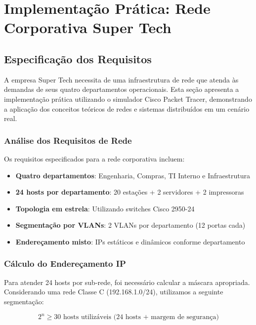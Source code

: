 \section{Implementação Prática: Rede Corporativa Super Tech}

\subsection{Especificação dos Requisitos}

A empresa Super Tech necessita de uma infraestrutura de rede que atenda às demandas de seus quatro departamentos operacionais. Esta seção apresenta a implementação prática utilizando o simulador Cisco Packet Tracer, demonstrando a aplicação dos conceitos teóricos de redes e sistemas distribuídos em um cenário real.

\subsubsection{Análise dos Requisitos de Rede}

Os requisitos especificados para a rede corporativa incluem:

\begin{itemize}
    \item \textbf{Quatro departamentos}: Engenharia, Compras, TI Interno e Infraestrutura
    \item \textbf{24 hosts por departamento}: 20 estações + 2 servidores + 2 impressoras
    \item \textbf{Topologia em estrela}: Utilizando switches Cisco 2950-24
    \item \textbf{Segmentação por VLANs}: 2 VLANs por departamento (12 portas cada)
    \item \textbf{Endereçamento misto}: IPs estáticos e dinâmicos conforme departamento
\end{itemize}

\subsubsection{Cálculo do Endereçamento IP}

Para atender 24 hosts por sub-rede, foi necessário calcular a máscara apropriada. Considerando uma rede Classe C (192.168.1.0/24), utilizamos a seguinte segmentação:

\begin{equation}
2^n \geq 30 \text{ hosts utilizáveis (24 hosts + margem de segurança)}
\end{equation}

